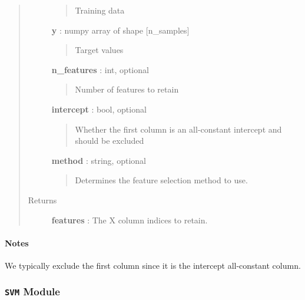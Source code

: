 \documentclass[letterpaper,10pt,english]{sphinxmanual}
\begin{document}
\begin{fulllineitems}
\begin{fulllineitems}
\begin{quote}
\begin{description}
\begin{quote}
Training data
\end{quote}

\textbf{y} : numpy array of shape {[}n\_samples{]}
\begin{quote}

Target values
\end{quote}

\textbf{n\_features} : int, optional
\begin{quote}

Number of features to retain
\end{quote}

\textbf{intercept} : bool, optional
\begin{quote}

Whether the first column is an all-constant intercept and 
should be excluded
\end{quote}

\textbf{method} : string, optional
\begin{quote}

Determines the feature selection method to use.
\end{quote}

\item[{Returns }] \leavevmode
\textbf{features} : The X column indices to retain.

\end{description}\end{quote}
\paragraph{Notes}

We typically exclude the first column since it is the intercept
all-constant column.

\end{fulllineitems}


\end{fulllineitems}



\subsubsection{\texttt{SVM} Module}
\label{qikify.controllers:svm-module}\label{qikify.controllers:module-qikify.controllers.SVM}
\end{document}
